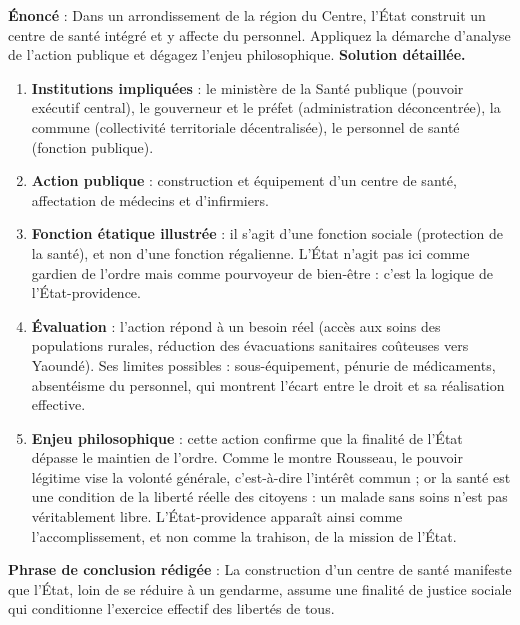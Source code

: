 \documentclass[11pt]{article}
\newcommand{\cle}[1]{{\popxbold\color{popdark}#1}}
\begin{document}
\begin{exoresolu}
\textbf{Énoncé} : Dans un arrondissement de la région du Centre, l'État construit un centre de santé intégré et y affecte du personnel. Appliquez la démarche d'analyse de l'action publique et dégagez l'enjeu philosophique.
\tcblower
\textbf{Solution détaillée.}
\begin{enumerate}
\item \textbf{Institutions impliquées} : le ministère de la Santé publique (pouvoir exécutif central), le gouverneur et le préfet (administration déconcentrée), la commune (collectivité territoriale décentralisée), le personnel de santé (fonction publique).
\item \textbf{Action publique} : construction et équipement d'un centre de santé, affectation de médecins et d'infirmiers.
\item \textbf{Fonction étatique illustrée} : il s'agit d'une fonction \cle{sociale} (protection de la santé), et non d'une fonction régalienne. L'État n'agit pas ici comme gardien de l'ordre mais comme pourvoyeur de bien-être : c'est la logique de l'\cle{État-providence}.
\item \textbf{Évaluation} : l'action répond à un besoin réel (accès aux soins des populations rurales, réduction des évacuations sanitaires coûteuses vers Yaoundé). Ses limites possibles : sous-équipement, pénurie de médicaments, absentéisme du personnel, qui montrent l'écart entre le droit et sa réalisation effective.
\item \textbf{Enjeu philosophique} : cette action confirme que la finalité de l'État dépasse le maintien de l'ordre. Comme le montre Rousseau, le pouvoir légitime vise la volonté générale, c'est-à-dire l'intérêt commun ; or la santé est une condition de la liberté réelle des citoyens : un malade sans soins n'est pas véritablement libre. L'État-providence apparaît ainsi comme l'accomplissement, et non comme la trahison, de la mission de l'État.
\end{enumerate}
\textbf{Phrase de conclusion rédigée} : La construction d'un centre de santé manifeste que l'État, loin de se réduire à un gendarme, assume une finalité de justice sociale qui conditionne l'exercice effectif des libertés de tous.
\end{exoresolu}
\end{document}
